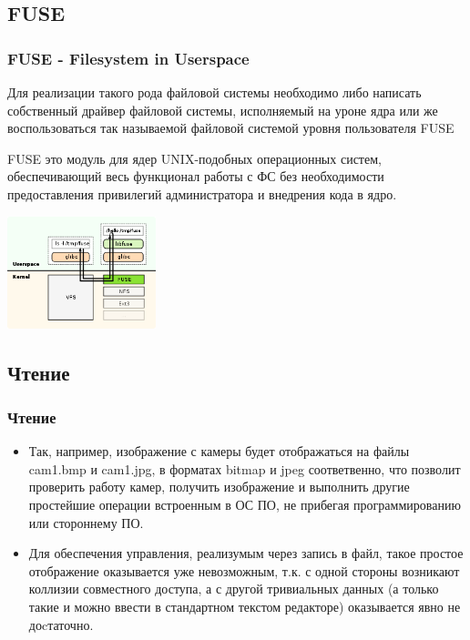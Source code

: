 \documentclass{beamer}
\begin{document}
\subsection{FUSE}
\begin{frame}
\frametitle{FUSE - Filesystem in Userspace}
Для реализации такого рода файловой системы необходимо либо написать собственный
драйвер файловой системы, исполняемый на уроне ядра или же воспользоваться так называемой файловой системой уровня пользователя FUSE


FUSE это модуль для ядер UNIX-подобных операционных систем, обеспечивающий весь
функционал работы с ФС без необходимости предоставления привилегий администратора и внедрения кода в ядро.

\includegraphics[width=4.3cm]{fuse.png}
\end{frame}

\subsection{Чтение}
\begin{frame}
\frametitle{Чтение}
\begin{itemize}
\item<1> Так, например,  изображение с камеры будет отображаться на файлы
cam1.bmp и cam1.jpg, в форматах bitmap и jpeg соответвенно, что позволит проверить работу камер, 
получить изображение и выполнить другие простейшие операции встроенным в ОС ПО, не прибегая 
программированию или стороннему ПО.
\item<1> Для обеспечения управления, реализумым через запись в файл, такое
простое отображение оказывается уже невозможным, т.к. с одной стороны возникают
коллизии совместного доступа, а с другой тривиальных данных (а только такие и
можно ввести в стандартном текстом редакторе) оказывается явно не доcтаточно.
\end{itemize}
\end{frame}
\end{document}
